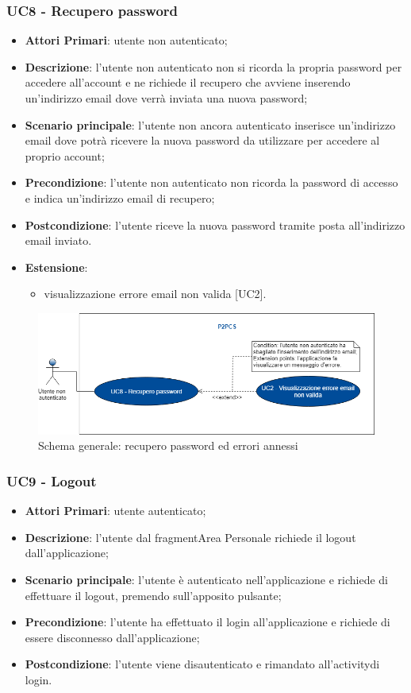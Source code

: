 \subsubsection{UC8 - Recupero password}
\begin{itemize}
	\item \textbf{Attori Primari}: utente non autenticato;
	\item \textbf{Descrizione}: l'utente non autenticato non si ricorda la propria password per accedere all'account e ne richiede il recupero che avviene inserendo un'indirizzo email dove verrà inviata una nuova password;
	\item \textbf{Scenario principale}: l'utente non ancora autenticato inserisce un'indirizzo email dove potrà ricevere la nuova password da utilizzare per accedere al proprio account; 
	\item \textbf{Precondizione}: l'utente non autenticato non ricorda la password di accesso e indica un'indirizzo email di recupero;
	\item \textbf{Postcondizione}: l'utente riceve la nuova password tramite posta all'indirizzo email inviato.
	\item \textbf{Estensione}:
		\begin{itemize}
			\item visualizzazione errore email non valida [UC2].
		\end{itemize}
\end{itemize}
\begin{figure}[h]
	\includegraphics[width=15cm]{res/images/Schemagenerale3.png}
	\centering
	\caption{Schema generale: recupero password ed errori annessi}
\end{figure}

\subsubsection{UC9 - Logout}
\begin{itemize}
	\item \textbf{Attori Primari}:
	utente autenticato;
	\item \textbf{Descrizione}: l'utente dal fragment\glosp Area Personale richiede il logout dall'applicazione;
	\item \textbf{Scenario principale}: l'utente è autenticato nell'applicazione e richiede di effettuare il logout, premendo sull'apposito pulsante;
	\item \textbf{Precondizione}: l'utente ha effettuato il login all'applicazione e richiede di essere disconnesso dall'applicazione;
	\item \textbf{Postcondizione}: l'utente viene disautenticato e rimandato all'activity\glosp di login. 
\end{itemize}

